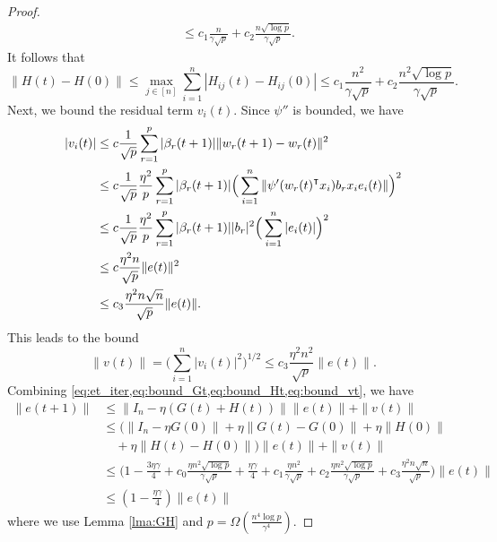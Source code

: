 \begin{proof}
\begin{equation*}
\begin{aligned}
    &\leq c_1 \frac{n}{\gamma\sqrt p} + c_2\frac{n\sqrt{\log p}}{\gamma\sqrt p}.
\end{aligned}
\end{equation*}
It follows that
\begin{equation}\label{eq:bound_Ht}
    \|H(t)-H(0)\| \leq \max_{j \in [n]}\sum_{i=1}^n|H_{ij}(t) - H_{ij}(0)| \leq c_1 \frac{n^2}{\gamma\sqrt p} + c_2\frac{n^2\sqrt{\log p}}{\gamma\sqrt p}.
\end{equation}
Next, we bound the residual term $v_i(t)$. Since $\psi''$ is bounded, we have
\begin{equation*}
\begin{aligned}
    |v_i(t)|
    &\leq c\frac{1}{\sqrt p}\sum_{r=1}^p|\beta_r(t+1)|\|w_r(t+1)-w_r(t)\|^2 \\
    &\leq c\frac{1}{\sqrt p}\frac{\eta^2}{p}\sum_{r=1}^p|\beta_r(t+1)|\Big(\sum_{i=1}^n\|\psi'(w_r(t)\transpose x_i)b_rx_ie_i(t)\|\Big)^2 \\
    &\leq c\frac{1}{\sqrt p}\frac{\eta^2}{p}\sum_{r=1}^p|\beta_r(t+1)||b_r|^2\Big(\sum_{i=1}^n|e_i(t)|\Big)^2 \\
    &\leq c\frac{\eta^2n}{\sqrt p}\|e(t)\|^2 \\
    &\leq c_3\frac{\eta^2n\sqrt n}{\sqrt p}\|e(t)\|.
\end{aligned}
\end{equation*}
This leads to the bound
\begin{equation}\label{eq:bound_vt}
    \|v(t)\| =\Big(\sum_{i=1}^n|v_i(t)|^2\Big)^{1/2} \leq c_3\frac{\eta^2n^2}{\sqrt p}\|e(t)\|.
\end{equation}
Combining \cref{eq:et_iter,eq:bound_Gt,eq:bound_Ht,eq:bound_vt}, we have
\begin{equation*}
\begin{aligned}
\|e(t+1)\|
&\leq \|I_n-\eta (G(t)+H(t))\|\|e(t)\|+\|v(t)\| \\
&\leq \Big(\|I_n-\eta G(0)\|+\eta\|G(t)-G(0)\|+\eta\|H(0)\| \\
&\quad +\eta\|H(t)-H(0)\|\Big)\|e(t)\| + \|v(t)\| \\
&\leq \Big( 1-\frac{3\eta\gamma}{4}+c_0\frac{\eta n^2\sqrt{\log p}}{\gamma\sqrt p}+\frac{\eta\gamma}{4}+c_1\frac{\eta n^2}{\gamma\sqrt p} + c_2\frac{\eta n^2\sqrt{\log p}}{\gamma\sqrt p}+c_3\frac{\eta^2n\sqrt n}{\sqrt p}\Big)\|e(t)\|  \\
&\leq(1-\frac{\eta\gamma}{4})\|e(t)\|
\end{aligned}
\end{equation*}
where we use Lemma \ref{lma:GH} and $p=\Omega(\frac{n^4\log p}{\gamma^4})$.
\end{proof}

